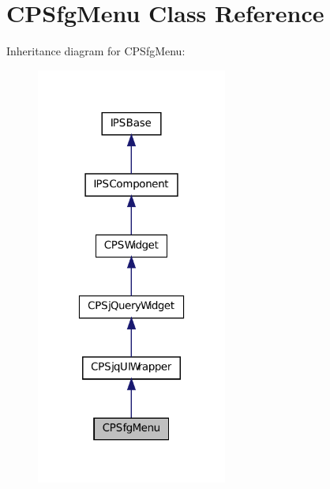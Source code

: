 \hypertarget{classCPSfgMenu}{
\section{CPSfgMenu Class Reference}
\label{classCPSfgMenu}
}


Inheritance diagram for CPSfgMenu:\nopagebreak
\begin{figure}[H]
\begin{center}
\leavevmode
\includegraphics[width=178pt]{classCPSfgMenu__inherit__graph}
\end{center}
\end{figure}



